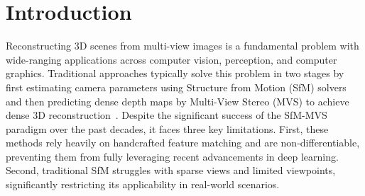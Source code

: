 \section{Introduction}\label{sec::intro}


Reconstructing 3D scenes from multi-view images is a fundamental problem with wide-ranging applications across computer vision, perception, and computer graphics. 
Traditional approaches typically solve this problem in two stages by first estimating camera parameters using Structure from Motion (SfM) solvers~\citep{hartley2003multiple, schonberger2016structure, snavely2006photo} and then  predicting dense depth maps by Multi-View Stereo (MVS) to achieve dense 3D reconstruction~\citep{seitz2006comparison, schonberger2016pixelwise}. 
% 
Despite the significant success of the SfM-MVS paradigm over the past decades, it faces three key limitations. First, these methods rely heavily on handcrafted feature matching and are non-differentiable, preventing them from fully leveraging recent advancements in deep learning. Second, traditional SfM struggles with sparse views and limited viewpoints, significantly restricting its applicability in real-world scenarios. 
%
%



